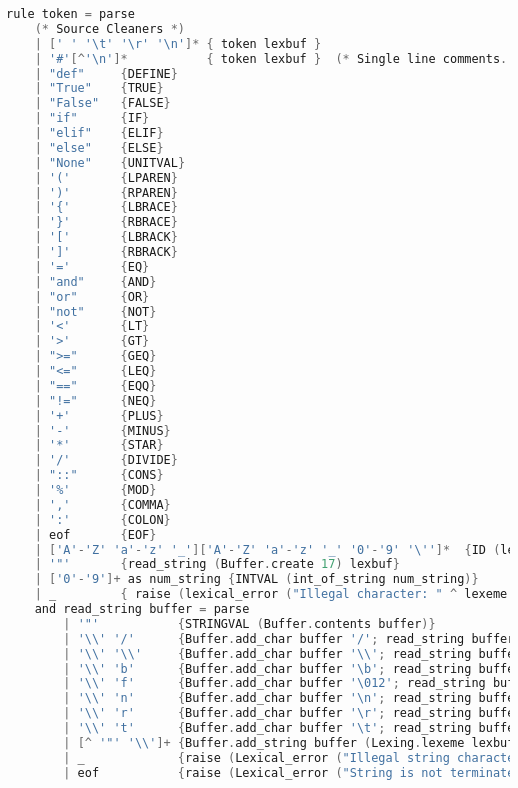 \documentclass{l4proj}
\begin{document}
\begin{appendices}
\begin{lstlisting}[language=C, caption=PyFunc's lexer specification for OCamllex., keepspaces=true]
rule token = parse
    (* Source Cleaners *)
    | [' ' '\t' '\r' '\n']* { token lexbuf }
    | '#'[^'\n']*           { token lexbuf }  (* Single line comments. *)
    | "def"     {DEFINE}
    | "True"    {TRUE}
    | "False"   {FALSE}
    | "if"      {IF}
    | "elif"    {ELIF}
    | "else"    {ELSE}
    | "None"    {UNITVAL}
    | '('       {LPAREN}
    | ')'       {RPAREN}
    | '{'       {LBRACE}
    | '}'       {RBRACE}
    | '['       {LBRACK}
    | ']'       {RBRACK}
    | '='       {EQ}
    | "and"     {AND}
    | "or"      {OR}
    | "not"     {NOT}
    | '<'       {LT}
    | '>'       {GT}
    | ">="      {GEQ}
    | "<="      {LEQ}
    | "=="      {EQQ}
    | "!="      {NEQ}
    | '+'       {PLUS}
    | '-'       {MINUS}
    | '*'       {STAR}
    | '/'       {DIVIDE}
    | "::"      {CONS}
    | '%'       {MOD}
    | ','       {COMMA}
    | ':'       {COLON}
    | eof       {EOF}
    | ['A'-'Z' 'a'-'z' '_']['A'-'Z' 'a'-'z' '_' '0'-'9' '\'']*  {ID (lexeme lexbuf)}
    | '"'       {read_string (Buffer.create 17) lexbuf}
    | ['0'-'9']+ as num_string {INTVAL (int_of_string num_string)}
    | _         { raise (lexical_error ("Illegal character: " ^ lexeme lexbuf))}
    and read_string buffer = parse
        | '"'           {STRINGVAL (Buffer.contents buffer)}
        | '\\' '/'      {Buffer.add_char buffer '/'; read_string buffer lexbuf}
        | '\\' '\\'     {Buffer.add_char buffer '\\'; read_string buffer lexbuf}
        | '\\' 'b'      {Buffer.add_char buffer '\b'; read_string buffer lexbuf}
        | '\\' 'f'      {Buffer.add_char buffer '\012'; read_string buffer lexbuf}
        | '\\' 'n'      {Buffer.add_char buffer '\n'; read_string buffer lexbuf}
        | '\\' 'r'      {Buffer.add_char buffer '\r'; read_string buffer lexbuf}
        | '\\' 't'      {Buffer.add_char buffer '\t'; read_string buffer lexbuf}
        | [^ '"' '\\']+ {Buffer.add_string buffer (Lexing.lexeme lexbuf);read_string buffer lexbuf}
        | _             {raise (Lexical_error ("Illegal string character: " ^ Lexing.lexeme lexbuf))}
        | eof           {raise (Lexical_error ("String is not terminated"))}
\end{lstlisting}


\end{appendices}
\end{document}
